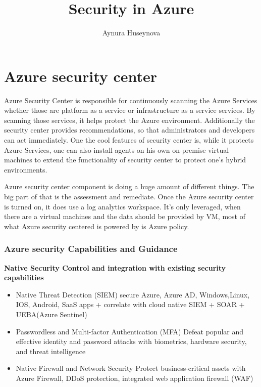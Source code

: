\documentclass{article}
\title{ Security in Azure }
\author{ Aynura Huseynova}
\begin{document}
\section{Azure security center}


Azure Security Center is responsible for continuously scanning the Azure Services whether those are platform as a service or infrastructure as a service services. By scanning those services, it helps protect the Azure environment. Additionally the security center provides recommendations, so that administrators and developers can act immediately.  One the cool features of security center is, while it protects Azure Services, one can also install agents on his own on-premise virtual machines to extend the functionality of security center to protect one’s hybrid environments.




Azure security center component is doing a huge amount of  different things. The big part of that is the assessment and remediate. Once the Azure security center is turned on, it does use a log analytics workspace. It’s only leveraged, when there are a virtual machines and the data should be provided by VM, most of what Azure security centered is powered by is Azure policy.



\subsubsection{Azure security Capabilities and Guidance}
\textbf{Native Security Control
and integration with existing security capabilities }
\begin{itemize}
    

\item  Native Threat Detection (SIEM)
secure Azure, Azure AD, Windows,Linux, IOS, Android, SaaS apps + correlate with cloud native SIEM + SOAR + UEBA(Azure Sentinel) 

\item Passwordless and Multi-factor Authentication (MFA)
Defeat popular and effective identity and password attacks with biometrics, hardware security, and threat intelligence 

\item Native Firewall and Network Security 
Protect business-critical assets with Azure Firewall, DDoS protection, integrated web application firewall (WAF) 

\end{itemize}
\end{document}
